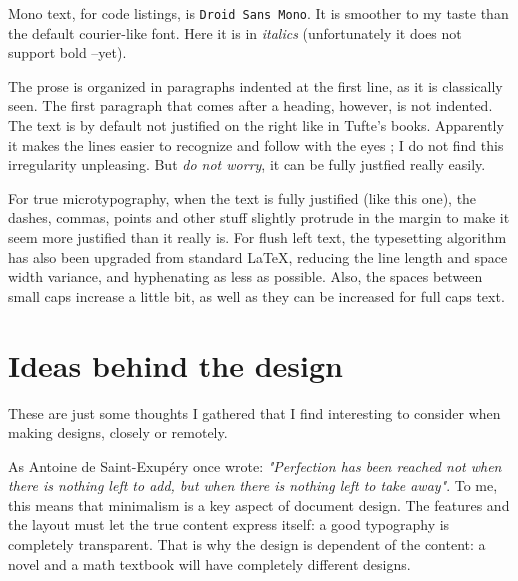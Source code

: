 \documentclass[
    11pt,
]{tufte-style-thesis}
\begin{document}
Mono text, for code listings, is \texttt{Droid Sans Mono}. It is smoother to my taste than the default courier-like font. Here it is in {\ttfamily\itshape italics} (unfortunately it does not support bold --yet).

The prose is organized in paragraphs indented at the first line, as it is classically seen. The first paragraph that comes after a heading, however, is not indented. The text is by default not justified on the right like in Tufte's books. Apparently it makes the lines easier to recognize and follow with the eyes ; I do not find this irregularity unpleasing. But \textit{do not worry}, it can be fully justfied really easily.

\bgroup\justifying
For true microtypography, when the text is fully justified (like this one), the dashes, commas, points and other stuff slightly protrude in the margin to make it seem more justified than it really is. For flush left text, the typesetting algorithm has also been upgraded from standard \LaTeX, reducing the line length and space width variance, and hyphenating as less as possible. Also, the spaces between small caps increase a little bit, as well as they can be increased for full caps text.
\egroup


\section{Ideas behind the design}

These are just some thoughts I gathered that I find interesting to consider when making designs, closely or remotely.

As Antoine de Saint-Exupéry once wrote: \textit{"Perfection has been reached not when there is nothing left to add, but when there is nothing left to take away"}. To me, this means that minimalism is a key aspect of document design. The features and the layout must let the true content express itself: a good typography is completely transparent. That is why the design is dependent of the content: a novel and a math textbook will have completely different designs.
\end{document}
